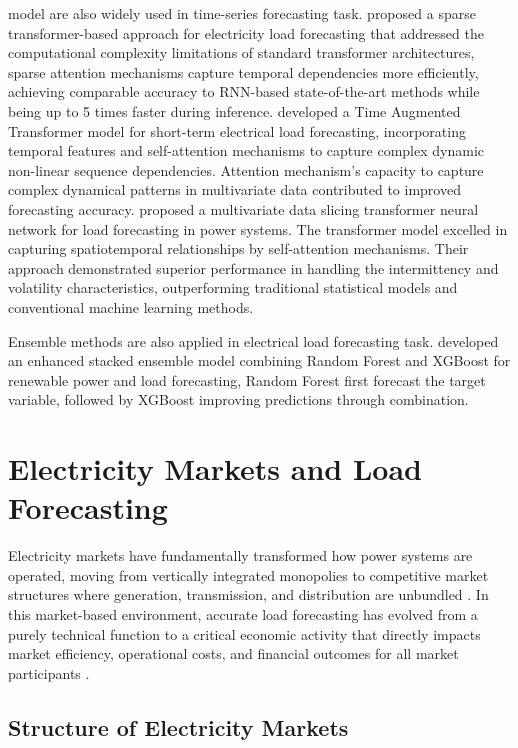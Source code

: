 \documentclass[oneside, 12pt]{book}
\numberwithin{equation}{chapter}
\newcommand{\sizexii}{\fontsize{12pt}{6pt}\selectfont}
\begin{document}
\parencite{vaswani2017attention} model are also widely used in time-series forecasting task. \parencite{chan2024sparse} proposed a sparse transformer-based approach for electricity load forecasting that addressed the computational complexity limitations of standard transformer architectures, sparse attention mechanisms capture temporal dependencies more efficiently, achieving comparable accuracy to RNN-based state-of-the-art methods while being up to 5 times faster during inference. \parencite{zhang2022time} developed a Time Augmented Transformer model for short-term electrical load forecasting, incorporating temporal features and self-attention mechanisms to capture complex dynamic non-linear sequence dependencies. Attention mechanism’s capacity to capture complex dynamical patterns in multivariate data contributed to improved forecasting accuracy. \parencite{lu2024multivariate} proposed a multivariate data slicing transformer neural network for load forecasting in power systems. The transformer model excelled in capturing spatiotemporal relationships by self-attention mechanisms. Their approach demonstrated superior performance in handling the intermittency and volatility characteristics, outperforming traditional statistical models and conventional machine learning methods.

Ensemble methods are also applied in electrical load forecasting task. \parencite{banik2024stacked} developed an enhanced stacked ensemble model combining Random Forest and XGBoost for renewable power and load forecasting, Random Forest first forecast the target variable, followed by XGBoost improving predictions through combination. 


\section{\sizexii Electricity Markets and Load Forecasting}

Electricity markets have fundamentally transformed how power systems are operated, moving from vertically integrated monopolies to competitive market structures where generation, transmission, and distribution are unbundled \parencite{kirschen2018fundamentals}. In this market-based environment, accurate load forecasting has evolved from a purely technical function to a critical economic activity that directly impacts market efficiency, operational costs, and financial outcomes for all market participants \parencite{weron2014electricity}.

\subsection{\sizexii Structure of Electricity Markets}
\end{document}
